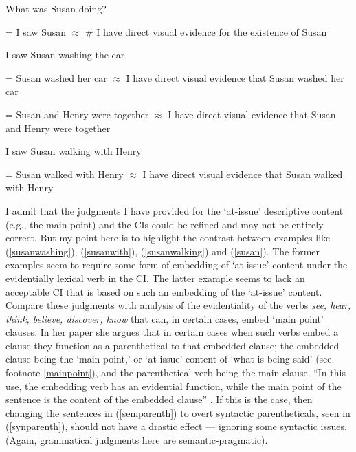 \documentclass{article}
\begin{document}
\begin{exe}
\ex What was Susan doing?\label{semparenth}
\begin{xlist}
\label{susan}
\begin{xlist}
 = I saw Susan
 $\approx$ \# I have direct visual evidence for the existence of Susan 
\end{xlist}
\ex I saw Susan washing the car\label{susanwashing}
\begin{xlist}
 = Susan washed her car
 $\approx$ I have direct visual evidence that Susan washed her car 
\end{xlist}
\label{susanwith}
\begin{xlist}
 = Susan and Henry were together
 $\approx$ I have direct visual evidence that Susan and Henry were together
\end{xlist}
\ex I saw Susan walking with Henry\label{susanwalking}
\begin{xlist}
 = Susan walked with Henry
 $\approx$ I have direct visual evidence that Susan walked with Henry
\end{xlist}
\end{xlist}
\end{exe}

I admit that the judgments I have provided for the `at-issue' descriptive content (e.g., the main point) and the CIs could be refined and may not be entirely correct. But my point here is to highlight the contrast between examples like (\ref{susanwashing}), (\ref{susanwith}), (\ref{susanwalking}) and (\ref{susan}). The former examples seem to require some form of embedding of `at-issue' content under the evidentially lexical verb in the CI. The latter example seems to lack an acceptable CI that is based on such an embedding of the `at-issue' content. Compare these judgments with  analysis of the evidentiality of the verbs {\sl see, hear, think, believe, discover, know} that can, in certain cases, embed `main point' clauses. In her paper she argues that in certain cases when such verbs embed a clause they function as a parenthetical to that embedded clause; the embedded clause being the `main point,' or `at-issue' content of `what is being said' (see footnote \ref{mainpoint}), and the parenthetical verb being the main clause. ``In this use, the embedding verb has an evidential function, while the main point of the sentence is the content of the embedded clause'' . If this is the case, then changing the sentences in (\ref{semparenth}) to overt syntactic parentheticals, seen in (\ref{synparenth}), should not have a drastic effect --- ignoring some syntactic issues. (Again, grammatical judgments here are semantic-pragmatic).
\end{document}
